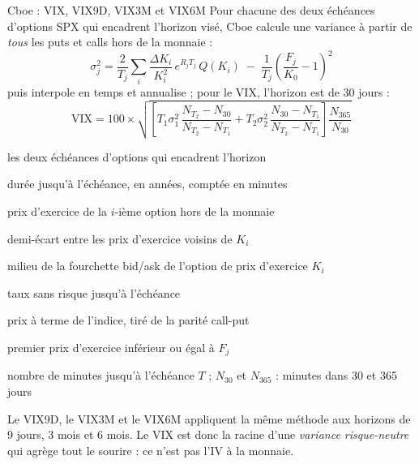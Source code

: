 \documentclass[10pt,a4paper]{article}
\newcommand{\notation}[2]{\makebox[2.3cm][l]{#1}\parbox[t]{\dimexpr\linewidth-2.3cm\relax}{#2}\par}
\begin{document}
\begin{fournisseur}{Cboe : VIX, VIX9D, VIX3M et VIX6M \cite{cboevix}}
Pour chacune des deux échéances d'options SPX qui encadrent l'horizon visé, Cboe calcule une variance à partir de \emph{tous} les puts et calls hors de la monnaie :
\begin{equation}\label{eq:vix}
\sigma_j^2=\frac{2}{T_j}\sum_i\frac{\Delta K_i}{K_i^2}\,e^{R_jT_j}\,Q(K_i)\;-\;\frac{1}{T_j}\left(\frac{F_j}{K_0}-1\right)^2
\end{equation}
puis interpole en temps et annualise ; pour le VIX, l'horizon est de 30 jours :
\begin{equation}\label{eq:vix30}
\mathrm{VIX}=100\times\sqrt{\left[T_1\sigma_1^2\,\frac{N_{T_2}-N_{30}}{N_{T_2}-N_{T_1}}+T_2\sigma_2^2\,\frac{N_{30}-N_{T_1}}{N_{T_2}-N_{T_1}}\right]\frac{N_{365}}{N_{30}}}
\end{equation}
\notation{$j=1,2$}{les deux échéances d'options qui encadrent l'horizon}
\notation{$T_j$}{durée jusqu'à l'échéance, en années, comptée en minutes}
\notation{$K_i$}{prix d'exercice de la $i$-ième option hors de la monnaie}
\notation{$\Delta K_i$}{demi-écart entre les prix d'exercice voisins de $K_i$}
\notation{$Q(K_i)$}{milieu de la fourchette bid/ask de l'option de prix d'exercice $K_i$}
\notation{$R_j$}{taux sans risque jusqu'à l'échéance}
\notation{$F_j$}{prix à terme de l'indice, tiré de la parité call-put}
\notation{$K_0$}{premier prix d'exercice inférieur ou égal à $F_j$}
\notation{$N_{T}$}{nombre de minutes jusqu'à l'échéance $T$ ; $N_{30}$ et $N_{365}$ : minutes dans 30 et 365 jours}
Le VIX9D, le VIX3M et le VIX6M appliquent la même méthode aux horizons de 9 jours, 3 mois et 6 mois. Le VIX est donc la racine d'une \emph{variance risque-neutre} qui agrège tout le sourire : ce n'est pas l'IV à la monnaie.
\end{fournisseur}
\end{document}
